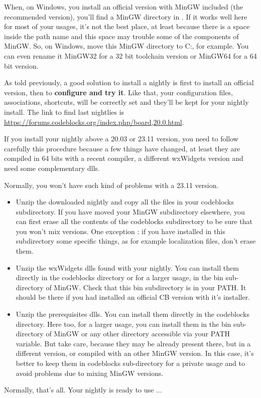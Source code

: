 When, on Windows, you install an official version with MinGW included (the recommended version), you'll find a MinGW directory in . If it works well here for most of your usages, it's not the best place, at least because there is a space inside the path name and this space may trouble some of the components of MinGW. So, on Windows, move this MinGW directory to C:, for example. You can even rename it MinGW32 for a 32 bit toolchain version or MinGW64 for a 64 bit version.

As told previously, a good solution to install a nightly is first to install an official version, then to \textbf{configure and try it}. Like that, your configuration files, associations, shortcuts, will be correctly set and they'll be kept for your nightly install. The link to find last nightlies is \url{https://forums.codeblocks.org/index.php/board,20.0.html}.

If you install your nightly above a 20.03 or 23.11 version, you need to follow carefully this procedure because a few things have changed, at least they are compiled in 64 bits with a recent compiler, a different wxWidgets version and need some complementary dlls.

Normally, you won't have such kind of problems with a 23.11 version.
\begin{itemize}
\item Unzip the downloaded nightly and copy all the files in your codeblocks subdirectory. If you have moved your MinGW subdirectory elsewhere, you can first erase all the contents of the codeblocks subdirectory to be sure that you won't mix versions. One exception : if you have installed in this subdirectory some specific things, as for example localization files, don't erase them.
\item Unzip the wxWidgets dlls found with your nightly. You can install them directly in the codeblocks directory or for a larger usage, in the bin sub-directory of MinGW. Check that this bin subdirectory is in your PATH. It should be there if you had installed an official CB version with it's installer.
\item Unzip the prerequisites dlls. You can install them directly in the codeblocks directory. Here too, for a larger usage, you can install them in the bin sub-directory of MinGW or any other directory accessible via your PATH variable. But take care, because they may be already present there, but in a different version, or compiled with an other MinGW version. In this case, it's better to keep them in codeblocks sub-directory for a private usage and to avoid problems due to mixing MinGW versions.
\end{itemize}


Normally, that's all. Your nightly is ready to use ...
